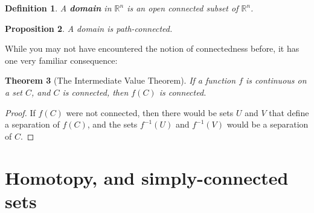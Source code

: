 \documentclass[12pt,letterpaper]{article}
\newtheorem{theorem}{Theorem}[section]
\newtheorem{proposition}[theorem]{Proposition}
\newtheorem{definition}[theorem]{Definition}
\newcommand{\R}{\mathbb{R}}
\begin{document}
\begin{definition}
A {\bf domain} in $\R^n$ is an open connected subset of $\R^n$.
\end{definition}
\begin{proposition}
A domain is path-connected.
\end{proposition}
While you may not have encountered the notion of connectedness before, it has one very familiar consequence:
\begin{theorem}[The Intermediate Value Theorem]
If a function $f$ is continuous on a set $C$, and $C$ is connected, then $f(C)$ is connected.
\end{theorem}
\begin{proof}
If $f(C)$ were not connected, then there would be sets $U$ and $V$ that define a separation of $f(C)$, and the sets $f^{-1}(U)$ and $f^{-1}(V)$ would be a separation of $C$.
\end{proof}

\section{Homotopy, and simply-connected sets}
\end{document}
